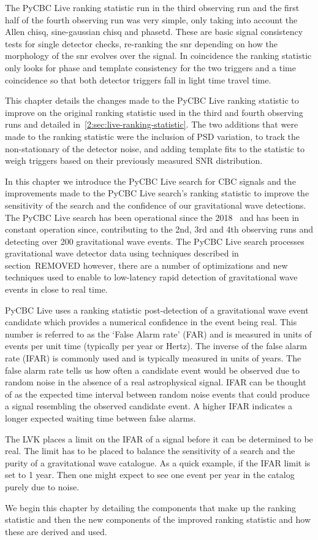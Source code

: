 The PyCBC Live ranking statistic run in the third observing run and the first half of the fourth observing run was very simple, only taking into account the Allen chisq, sine-gaussian chisq and phasetd. These are basic signal consistency tests for single detector checks, re-ranking the snr depending on how the morphology of the snr evolves over the signal. In coincidence the ranking statistic only looks for phase and template consistency for the two triggers and a time coincidence so that both detector triggers fall in light time travel time.



This chapter details the changes made to the PyCBC Live ranking statistic to improve on the original ranking statistic used in the third and fourth observing runs and detailed in~\ref{2:sec:live-ranking-statistic}. The two additions that were made to the ranking statistic were the inclusion of PSD variation, to track the non-stationary of the detector noise, and adding template fits to the statistic to weigh triggers based on their previously measured SNR distribution.

In this chapter we introduce the PyCBC Live search for CBC signals and the improvements made to the PyCBC Live search's ranking statistic to improve the sensitivity of the search and the confidence of our gravitational wave detections. The PyCBC Live search has been operational since the 2018~\cite{PyCBC_Live:2018} and has been in constant operation since, contributing to the 2nd, 3rd and 4th observing runs and detecting over 200 gravitational wave events. The PyCBC Live search processes gravitational wave detector data using techniques described in section~REMOVED however, there are a number of optimizations and new techniques used to enable to low-latency rapid detection of gravitational wave events in close to real time.

PyCBC Live uses a ranking statistic post-detection of a gravitational wave event candidate which provides a numerical confidence in the event being real. This number is referred to as the `False Alarm rate' (FAR) and is measured in units of events per unit time (typically per year or Hertz). The inverse of the false alarm rate (IFAR) is commonly used and is typically measured in units of years. The false alarm rate tells us how often a candidate event would be observed due to random noise in the absence of a real astrophysical signal. IFAR can be thought of as the expected time interval between random noise events that could produce a signal resembling the observed candidate event. A higher IFAR indicates a longer expected waiting time between false alarms.

The LVK places a limit on the IFAR of a signal before it can be determined to be real. The limit has to be placed to balance the sensitivity of a search and the purity of a gravitational wave catalogue. As a quick example, if the IFAR limit is set to 1 year. Then one might expect to see one event per year in the catalog purely due to noise.

We begin this chapter by detailing the components that make up the ranking statistic and then the new components of the improved ranking statistic and how these are derived and used.

